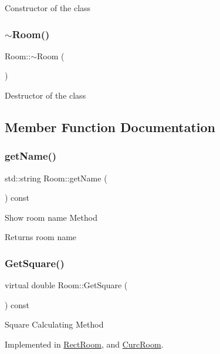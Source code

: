 Constructor of the class \mbox{\label{class_room_a67d5da09983cc53097807fd43ba5481a}} 
\subsubsection{\texorpdfstring{$\sim$\+Room()}{~Room()}}
{\footnotesize\ttfamily Room\+::$\sim$\+Room (\begin{DoxyParamCaption}{ }\end{DoxyParamCaption})}

Destructor of the class 

\subsection{Member Function Documentation}
\mbox{\label{class_room_a767de198f529425dd4ba81810e44d6e4}} 
\subsubsection{\texorpdfstring{get\+Name()}{getName()}}
{\footnotesize\ttfamily std\+::string Room\+::get\+Name (\begin{DoxyParamCaption}{ }\end{DoxyParamCaption}) const}

Show room name Method \begin{DoxyReturn}{Returns}
room name 
\end{DoxyReturn}
\mbox{\label{class_room_a031b559260949b3fa9e27053aaf602f5}} 
\subsubsection{\texorpdfstring{Get\+Square()}{GetSquare()}}
{\footnotesize\ttfamily virtual double Room\+::\+Get\+Square (\begin{DoxyParamCaption}{ }\end{DoxyParamCaption}) const\hspace{0.3cm}{\ttfamily [pure virtual]}}

Square Calculating Method 

Implemented in \mbox{\hyperlink{class_rect_room_a3308e46aa110d1b453d7a80cfbb5b5a2}{Rect\+Room}}, and \mbox{\hyperlink{class_curc_room_a0026b4be5fc20d3d1e701d4c5acdf994}{Curc\+Room}}.

